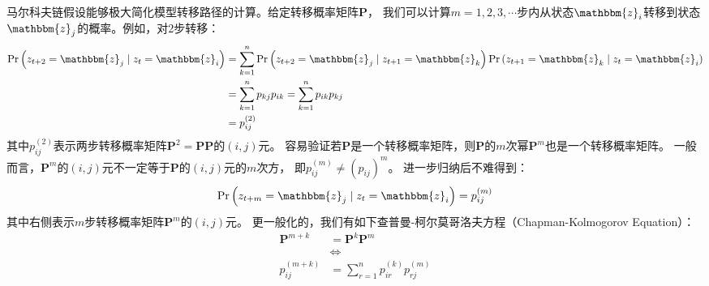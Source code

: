 马尔科夫链假设能够极大简化模型转移路径的计算。给定转移概率矩阵$\boldsymbol{P}$，
我们可以计算$m=1,2,3,\cdots$步内从状态$\mathbbm{z}_i$转移到状态$\mathbbm{z}_j$的概率。例如，对2步转移：
\begin{equation*}
    \begin{aligned}
        \operatorname{Pr}\left(z_{t+2}=\mathbbm{z}_j \mid z_t=\mathbbm{z}_i\right) 
            &= \sum_{k=1}^n \operatorname{Pr}\left(z_{t+2}=\mathbbm{z}_j \mid z_{t+1}=\mathbbm{z}_k\right) 
                    \operatorname{Pr}\left(z_{t+1}=\mathbbm{z}_k \mid z_t=\mathbbm{z}_i\right) \\
            &= \sum_{k=1}^n p_{k j} p_{i k} = \sum_{k=1}^n p_{i k} p_{k j} \\
            &= p^{\left(2\right)}_{i j} 
    \end{aligned}
\end{equation*}
其中$p^{\left(2\right)}_{i j}$表示两步转移概率矩阵$\boldsymbol{P}^2=\boldsymbol{P}\boldsymbol{P}$的$(i,j)$元。
容易验证若$\boldsymbol{P}$是一个转移概率矩阵，则$\boldsymbol{P}$的$m$次幂$\boldsymbol{P}^{m}$也是一个转移概率矩阵。
一般而言，$\boldsymbol{P}^{m}$的$(i,j)$元不一定等于$\boldsymbol{P}$的$(i,j)$元的$m$次方，
即$p^{\left(m\right)}_{i j}\neq \left(p_{i j}\right)^m$。
进一步归纳后不难得到：
\begin{equation}
    \operatorname{Pr}\left(z_{t+m}= \mathbbm{z}_j\mid z_t=\mathbbm{z}_i\right) = p^{\left(m\right)}_{i j}
\end{equation}
其中右侧表示$m$步转移概率矩阵$\boldsymbol{P}^m$的$(i,j)$元。
更一般化的，我们有如下查普曼-柯尔莫哥洛夫方程（Chapman-Kolmogorov Equation）：
\begin{equation}
    \begin{aligned}
        \boldsymbol{P}^{m+k} &= \boldsymbol{P}^k\boldsymbol{P}^m \\
        & \Leftrightarrow \\
        p^{(m+k)}_{i j} &= \sum_{r=1}^{n}p^{(k)}_{i r}p^{(m)}_{r j}
    \end{aligned}
\end{equation}

